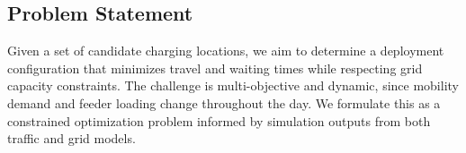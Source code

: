 \subsection{Problem Statement}
\label{subsec:problem}
Given a set of candidate charging locations, we aim to determine a deployment configuration that minimizes travel and waiting times while respecting grid capacity constraints. The challenge is multi-objective and dynamic, since mobility demand and feeder loading change throughout the day. We formulate this as a constrained optimization problem informed by simulation outputs from both traffic and grid models.
